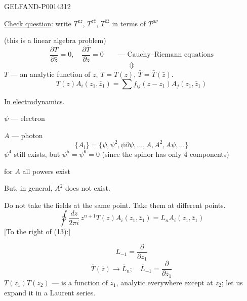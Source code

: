 \begin{GelfandAdjacentEvidence}{GELFAND-P001431}{2}


\uline{Check question}: write \(T^{zz}\), \(T^{z\bar z}\), \(T^{\bar z\bar z}\)
in terms of \(T^{\mu\nu}\)

(this is a linear algebra problem)
\begin{equation*}
\tag{11}
\frac{\partial T}{\partial\bar z}=0,\quad
\frac{\partial\bar T}{\partial z}=0
\qquad\text{— Cauchy–Riemann equations}
\end{equation*}
\[
\Updownarrow
\]
\(T\) — an analytic function of \(z\), \(T=T(z)\), \(\bar T=\bar T(\bar z)\).
\begin{equation*}
\tag{12}
T(z)A_i(z_1,\bar z_1)=\sum f_{ij}(z-z_1)A_j(z_1,\bar z_1)
\end{equation*}

\uline{In electrodynamics}.

\(\psi\) — electron

\(A\) — photon
\[
\{A_i\}=\{\psi,\psi^2,\psi\partial\psi,\ldots,A,A^2,A\psi,\ldots\}
\]
\(\psi^4\) still exists, but \(\psi^5=\psi^6=0\) (since the spinor has only 4 components)

for \(A\) all powers exist

But, in general, \(A^2\) does not exist.

Do not take the fields at the same point. Take them at different points.
\begin{equation*}
\tag{13}
\oint\frac{dz}{2\pi i}\,z^{n+1}T(z)A_i(z_1,\bar z_1)
=L_nA_i(z_1,\bar z_1)
\end{equation*}
[To the right of (13):]
\end{GelfandAdjacentEvidence}

\[
L_{-1}=\frac{\partial}{\partial z_1}
\]
\begin{equation*}
\tag{14}
\bar T(\bar z)\to\bar L_n;\quad
\bar L_{-1}=\frac{\partial}{\partial\bar z_1}
\end{equation*}
\(T(z_1)T(z_2)\) — is a function of \(z_1\), analytic everywhere except at \(z_2\);
let us expand it in a Laurent series.



